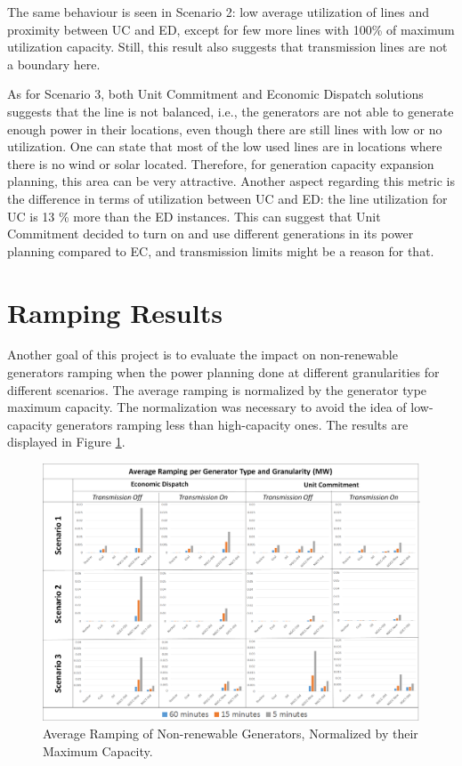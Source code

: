 \documentclass[12pt,LUDisStyle,twosided]{book}
\begin{document}
The same behaviour is seen in Scenario 2: low average utilization of lines and proximity between UC and ED, except for few more lines with 100\% of maximum utilization capacity. Still, this result also suggests that transmission lines are not a boundary here.

As for Scenario 3, both Unit Commitment and Economic Dispatch solutions suggests that the line is not balanced, i.e., the generators are not able to generate enough power in their locations, even though there are still lines with low or no utilization. One can state that most of the low used lines are in locations where there is no wind or solar located. Therefore, for generation capacity expansion planning, this area can be very attractive. Another aspect regarding this metric is the difference in terms of utilization between UC and ED: the line utilization for UC is 13 \% more than the ED instances. This can suggest that Unit Commitment decided to turn on and use different generations in its power planning compared to EC, and transmission limits might be a reason for that.

\section{Ramping Results} \label{section:ramping}

Another goal of this project is to evaluate the impact on non-renewable generators ramping when the power planning done at different granularities for different scenarios. The average ramping is normalized by the generator type maximum capacity. The normalization was necessary to avoid the idea of low-capacity generators ramping less than high-capacity ones. The results are displayed in Figure  \ref{fig:averageramping}.

\begin{figure}[H] 
  \centering
  
	  \includegraphics[width=\textwidth,height=\textheight,keepaspectratio]{averageRamping.png}
  
  \caption{Average Ramping of Non-renewable Generators, Normalized by their Maximum Capacity.}
  \label{fig:averageramping}
    
\end{figure}
\end{document}
